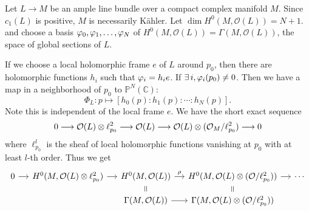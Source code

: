 \documentclass[12pt]{article}
\begin{document}
Let \(L\to M\) be an ample line bundle over a compact complex manifold \(M\).
Since \(c_1(L)\) is positive, \(M\) is necessarily Kähler. Let \(\dim H^0(M,
\mathcal{O}(L))=N+1\). and choose a basis \(\varphi_0,\varphi_1,\ldots,\varphi_N\)
of \(H^0(M,\mathcal{O}(L))=\Gamma(M,\mathcal{O}(L))\), the space of global
sections of \(L\).

If we choose a local holomorphic frame \(e\) of \(L\) around \(p_0\), then there
are holomorphic functions \(h_i\) such that \(\varphi_i=h_i e\). If \(\exists\,i,
\varphi_i(p_0) \neq 0\). Then we have a map in a neighborhood of \(p_0\) to
\(\mathbb{P}^N(\mathbb{C})\): \[
  \Phi_L\colon p\longmapsto [h_0(p):h_1(p):\cdots:h_N(p)]
.\] Note this is independent of the local frame \(e\). We have the short exact
sequence \[
  0\longrightarrow \mathcal{O}(L)\otimes \ell_{p_0}^2\longrightarrow \mathcal{O}(L)\longrightarrow \mathcal{O}(L)
  \otimes (\mathcal{O}_M/\ell_{p_0}^2)\longrightarrow 0
\] where \(\ell_{p_0}^l\) is the sheaf of local holomorphic functions vanishing
at \(p_0\) with at least \(l\)-th order. Thus we get
\[\begin{tikzcd}[row sep=small,column sep=small]
	0 & {H^0(M,\mathcal{O}(L)\otimes \ell_{p_0}^2)} & {H^0(M,\mathcal{O}(L))} & {H^0(M,\mathcal{O}(L)\otimes (\mathcal{O}/\ell_{p_0}^2))} & \cdots \\
	&& {\Gamma(M,\mathcal{O}(L))} & {\Gamma(M,\mathcal{O}(L)\otimes(\mathcal{O}/\ell_{p_0}^2))}
	\arrow[from=1-1, to=1-2]
	\arrow[from=1-2, to=1-3]
	\arrow["\rho", from=1-3, to=1-4]
	\arrow[from=1-4, to=1-5]
	\arrow["{=}"{marking, allow upside down}, draw=none, from=1-3, to=2-3]
	\arrow[from=2-3, to=2-4]
	\arrow["{=}"{marking, allow upside down}, draw=none, from=1-4, to=2-4]
\end{tikzcd}\]
\end{document}
